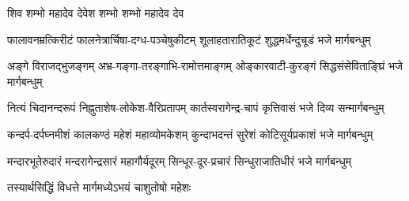 

{शिव शम्भो महादेव देवेश शम्भो}
{शम्भो महादेव देव}

\twolineshloka
{फालावनम्रत्किरीटं फालनेत्रार्चिषा-दग्ध-पञ्चेषुकीटम्}
{शूलाहतारातिकूटं शुद्धमर्धेन्दुचूडं भजे मार्गबन्धुम्}

\twolineshloka
{अङ्गे विराजद्भुजङ्गम् अभ्र-गङ्गा-तरङ्गाभि-रामोत्तमाङ्गम्}
{ओङ्कारवाटी-कुरङ्गं सिद्धसंसेविताङ्घ्रिं भजे मार्गबन्धुम्}

\twolineshloka
{नित्यं चिदानन्दरूपं निह्नुताशेष-लोकेश-वैरिप्रतापम्}
{कार्तस्वरागेन्द्र-चापं कृत्तिवासं भजे दिव्य सन्मार्गबन्धुम्}

\twolineshloka
{कन्दर्प-दर्पघ्नमीशं कालकण्ठं महेशं महाव्योमकेशम्}
{कुन्दाभदन्तं सुरेशं कोटिसूर्यप्रकाशं भजे मार्गबन्धुम्}

\twolineshloka
{मन्दारभूतेरुदारं मन्दरागेन्द्रसारं महागौर्यदूरम्}
{सिन्धूर-दूर-प्रचारं सिन्धुराजातिधीरं भजे मार्गबन्धुम्}

{तस्यार्थसिद्धिं विधत्ते मार्गमध्येऽभयं चाशुतोषो महेशः}